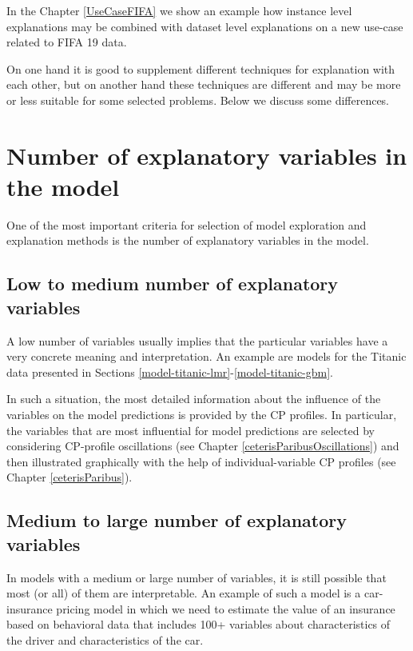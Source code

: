 \documentclass[]{krantz}
\begin{document}
In the Chapter \ref{UseCaseFIFA} we show an example how instance level explanations may be combined with dataset level explanations on a new use-case related to FIFA 19 data.

On one hand it is good to supplement different techniques for explanation with each other, but on another hand these techniques are different and may be more or less suitable for some selected problems. Below we discuss some differences.

\hypertarget{number-of-explanatory-variables-in-the-model}{%
\section{Number of explanatory variables in the model}\label{number-of-explanatory-variables-in-the-model}}

One of the most important criteria for selection of model exploration and explanation methods is the number of explanatory variables in the model.

\hypertarget{low-to-medium-number-of-explanatory-variables}{%
\subsection{Low to medium number of explanatory variables}\label{low-to-medium-number-of-explanatory-variables}}

A low number of variables usually implies that the particular variables have a very concrete meaning and interpretation. An example are models for the Titanic data presented in Sections \ref{model-titanic-lmr}-\ref{model-titanic-gbm}.

In such a situation, the most detailed information about the influence of the variables on the model predictions is provided by the CP profiles. In particular, the variables that are most influential for model predictions are selected by considering CP-profile oscillations (see Chapter \ref{ceterisParibusOscillations}) and then illustrated graphically with the help of individual-variable CP profiles (see Chapter \ref{ceterisParibus}).

\hypertarget{medium-to-large-number-of-explanatory-variables}{%
\subsection{Medium to large number of explanatory variables}\label{medium-to-large-number-of-explanatory-variables}}

In models with a medium or large number of variables, it is still possible that most (or all) of them are interpretable. An example of such a model is a car-insurance pricing model in which we need to estimate the value of an insurance based on behavioral data that includes 100+ variables about characteristics of the driver and characteristics of the car.
\end{document}
